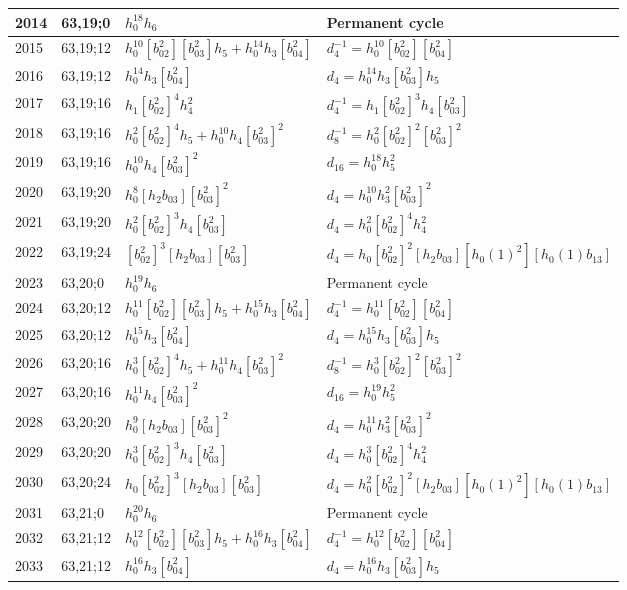 \documentclass{article}
\begin{document}
\begin{longtable}{|l|l|>{\raggedright\arraybackslash}p{6cm}|>{\raggedright\arraybackslash}p{6cm}|}
\hline
2014 & 63,19;0 & $h_0^{18}h_6$ & Permanent cycle\\
\hline
2015 & 63,19;12 & $h_0^{10}[b_{02}^2][b_{03}^2]h_5 + h_0^{14}h_3[b_{04}^2]$ & $d_{4}^{-1}=h_0^{10}[b_{02}^2][b_{04}^2]$\\
2016 & 63,19;12 & $h_0^{14}h_3[b_{04}^2]$ &$d_{4}=h_0^{14}h_3[b_{03}^2]h_5$\\
\hline
2017 & 63,19;16 & $h_1[b_{02}^2]^4h_4^2$ & $d_{4}^{-1}=h_1[b_{02}^2]^3h_4[b_{03}^2]$\\
2018 & 63,19;16 & $h_0^2[b_{02}^2]^4h_5 + h_0^{10}h_4[b_{03}^2]^2$ & $d_{8}^{-1}=h_0^2[b_{02}^2]^2[b_{03}^2]^2$\\
2019 & 63,19;16 & $h_0^{10}h_4[b_{03}^2]^2$ &$d_{16}=h_0^{18}h_5^2$\\
\hline
2020 & 63,19;20 & $h_0^8[h_2b_{03}][b_{03}^2]^2$ &$d_{4}=h_0^{10}h_3^2[b_{03}^2]^2$\\
2021 & 63,19;20 & $h_0^2[b_{02}^2]^3h_4[b_{03}^2]$ &$d_{4}=h_0^2[b_{02}^2]^4h_4^2$\\
\hline
2022 & 63,19;24 & $[b_{02}^2]^3[h_2b_{03}][b_{03}^2]$ &$d_{4}=h_0[b_{02}^2]^2[h_2b_{03}][h_0(1)^2][h_0(1)b_{13}]$\\
\hline
2023 & 63,20;0 & $h_0^{19}h_6$ & Permanent cycle\\
\hline
2024 & 63,20;12 & $h_0^{11}[b_{02}^2][b_{03}^2]h_5 + h_0^{15}h_3[b_{04}^2]$ & $d_{4}^{-1}=h_0^{11}[b_{02}^2][b_{04}^2]$\\
2025 & 63,20;12 & $h_0^{15}h_3[b_{04}^2]$ &$d_{4}=h_0^{15}h_3[b_{03}^2]h_5$\\
\hline
2026 & 63,20;16 & $h_0^3[b_{02}^2]^4h_5 + h_0^{11}h_4[b_{03}^2]^2$ & $d_{8}^{-1}=h_0^3[b_{02}^2]^2[b_{03}^2]^2$\\
2027 & 63,20;16 & $h_0^{11}h_4[b_{03}^2]^2$ &$d_{16}=h_0^{19}h_5^2$\\
\hline
2028 & 63,20;20 & $h_0^9[h_2b_{03}][b_{03}^2]^2$ &$d_{4}=h_0^{11}h_3^2[b_{03}^2]^2$\\
2029 & 63,20;20 & $h_0^3[b_{02}^2]^3h_4[b_{03}^2]$ &$d_{4}=h_0^3[b_{02}^2]^4h_4^2$\\
\hline
2030 & 63,20;24 & $h_0[b_{02}^2]^3[h_2b_{03}][b_{03}^2]$ &$d_{4}=h_0^2[b_{02}^2]^2[h_2b_{03}][h_0(1)^2][h_0(1)b_{13}]$\\
\hline
2031 & 63,21;0 & $h_0^{20}h_6$ & Permanent cycle\\
\hline
2032 & 63,21;12 & $h_0^{12}[b_{02}^2][b_{03}^2]h_5 + h_0^{16}h_3[b_{04}^2]$ & $d_{4}^{-1}=h_0^{12}[b_{02}^2][b_{04}^2]$\\
2033 & 63,21;12 & $h_0^{16}h_3[b_{04}^2]$ &$d_{4}=h_0^{16}h_3[b_{03}^2]h_5$\\

\end{longtable}
\end{document}
